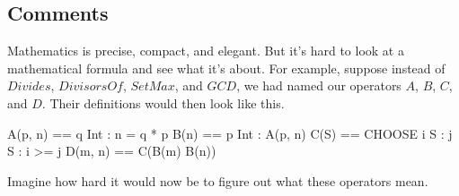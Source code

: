 \documentclass[fleqn,leqno]{article}
\begin{document}

  \vspace{-\baselineskip}%
%
\subsection{Comments} 

Mathematics is precise, compact, and elegant.  But it's hard to look
at a mathematical formula and see what it's about.  For example, suppose
instead of $Divides$, $DivisorsOf$, $SetMax$, and $GCD$,
we had named our operators $A$, $B$, $C$, and $D$.  Their definitions 
would then look like this.
\begin{display}
\begin{notla}
A(p, n) == \E q \in Int : n = q * p
B(n)    == {p \in Int : A(p, n)}
C(S)    == CHOOSE i \in S : \A j \in S : i >= j
D(m, n) == C(B(m) \cap B(n))
\end{notla}
\begin{tlatex}
%
%
\end{tlatex}
\end{display}
Imagine how hard it would now be to figure out what these operators mean.
\end{document}
